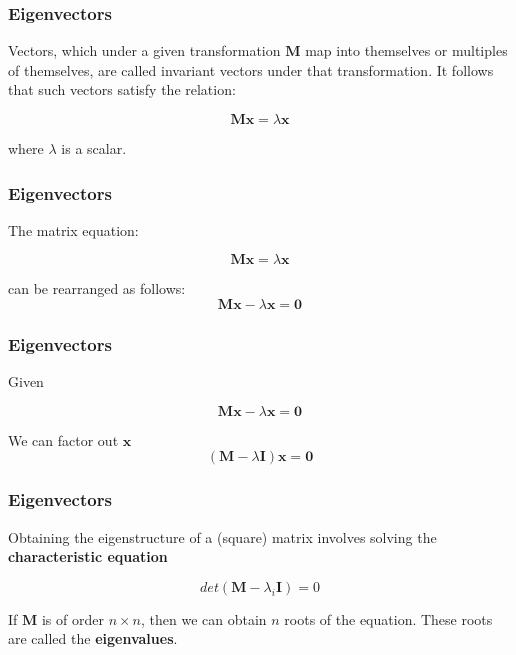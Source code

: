 \documentclass[12pt]{beamer}\usepackage[]{graphicx}\usepackage[]{color}
\begin{document}

\begin{frame}
\frametitle{Eigenvectors}

Vectors, which under a given transformation $\mathbf{M}$ map into 
themselves or multiples of themselves, are called invariant vectors under 
that transformation. It follows that such vectors satisfy the relation:

{\Large
$$
\mathbf{M x} = \lambda \mathbf{x}
$$
}

where $\lambda$ is a scalar.

\end{frame}


\begin{frame}
\frametitle{Eigenvectors}

The matrix equation:

{\large
$$
\mathbf{M x} = \lambda \mathbf{x}
$$
}

can be rearranged as follows:
{\large
$$
\mathbf{M x} - \lambda \mathbf{x} = \mathbf{0}
$$
}

\end{frame}


\begin{frame}
\frametitle{Eigenvectors}

Given

{\large
$$
\mathbf{M x} - \lambda \mathbf{x} = \mathbf{0}
$$
}

We can factor out $\mathbf{x}$
{\large
$$
(\mathbf{M} - \lambda \mathbf{I}) \mathbf{x} = \mathbf{0}
$$
}

\end{frame}


\begin{frame}
\frametitle{Eigenvectors}

Obtaining the eigenstructure of a (square) matrix involves solving the 
\textbf{characteristic equation}

{\large
$$
det(\mathbf{M} - \lambda_i \mathbf{I}) = 0
$$
}

If $\mathbf{M}$ is of order $n \times n$, then we can obtain $n$ roots of the 
equation. These roots are called the \textbf{eigenvalues}.

\end{frame}
\end{document}
